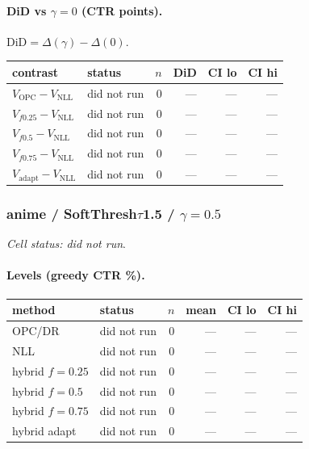 \documentclass[10pt,a4paper]{article}
\begin{document}
\paragraph{DiD vs $\gamma=0$ (CTR points).} $\mathrm{DiD}=\Delta(\gamma)-\Delta(0)$.
{\centering\small\begin{tabular}{llrrrr}
\toprule contrast & status & $n$ & DiD & CI lo & CI hi \\
\midrule
$V_{\mathrm{OPC}}-V_{\mathrm{NLL}}$ & did not run & 0 & --- & --- & --- \\
$V_{f0.25}-V_{\mathrm{NLL}}$ & did not run & 0 & --- & --- & --- \\
$V_{f0.5}-V_{\mathrm{NLL}}$ & did not run & 0 & --- & --- & --- \\
$V_{f0.75}-V_{\mathrm{NLL}}$ & did not run & 0 & --- & --- & --- \\
$V_{\mathrm{adapt}}-V_{\mathrm{NLL}}$ & did not run & 0 & --- & --- & --- \\
\bottomrule\end{tabular}\par}
\bigskip
\subsubsection{anime / SoftThresh$\tau$1.5 / $\gamma=0.5$}
\emph{Cell status: did not run}.
\paragraph{Levels (greedy CTR \%).}
{\centering\small\begin{tabular}{llrrrr}
\toprule method & status & $n$ & mean & CI lo & CI hi \\
\midrule
OPC/DR & did not run & 0 & --- & --- & --- \\
NLL & did not run & 0 & --- & --- & --- \\
hybrid $f{=}0.25$ & did not run & 0 & --- & --- & --- \\
hybrid $f{=}0.5$ & did not run & 0 & --- & --- & --- \\
hybrid $f{=}0.75$ & did not run & 0 & --- & --- & --- \\
hybrid adapt & did not run & 0 & --- & --- & --- \\
\bottomrule\end{tabular}\par}
\end{document}
